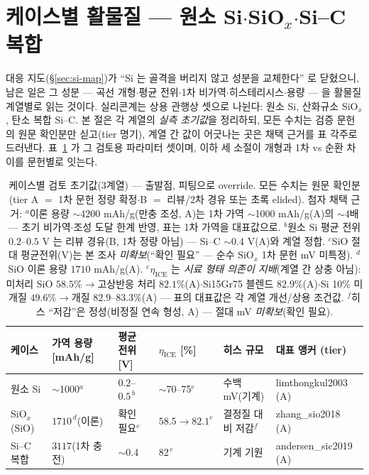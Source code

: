 \section{케이스별 활물질 --- 원소 Si$\cdot$SiO$_x$$\cdot$Si--C 복합}\label{sec:si-cases}
대응 지도(\S\ref{sec:si-map})가 ``Si 는 골격을 버리지 않고 성분을 교체한다'' 로 닫혔으니, 남은 일은
그 성분 --- 곡선 개형$\cdot$평균 전위$\cdot$1차 비가역$\cdot$히스테리시스$\cdot$용량 --- 을 활물질 계열별로
읽는 것이다. 실리콘계는 상용 관행상 셋으로 나뉜다: 원소 Si, 산화규소 SiO$_x$, 탄소 복합 Si--C. 본 절은 각
계열의 \emph{실측 초기값}을 정리하되, 모든 수치는 검증 문헌의 원문 확인분만 싣고(tier 명기), 계열 간 값이
어긋나는 곳은 채택 근거를 표 각주로 드러낸다. 표~\ref{tab:si-cases} 가 그 검토용 파라미터
셋이며, 이하 세 소절이 개형과 1차 vs 순환 차이를 문헌별로 잇는다.

\begin{table}[t]
\centering\footnotesize
\renewcommand{\arraystretch}{1.3}
\caption{케이스별 검토 초기값(3계열) --- 출발점, 피팅으로 override. 모든 수치는 원문 확인분(tier A $=$
1차 문헌 정량 확정$\cdot$B $=$ 리뷰/2차 경유 또는 초록 elided). 첨자 채택 근거:
$^a$이론 용량 $\sim$4200 mAh/g(만충 조성\cite{wen_huggins1981}, A)는 1차 가역 $\sim$1000
mAh/g\cite{limthongkul2003}(A)의 $\sim$4배 --- 초기 비가역$\cdot$조성 도달 한계 반영, 표는 1차 가역을
대표값으로. $^b$원소 Si 평균 전위 $0.2$--$0.5$ V 는 리뷰 경유\cite{obrovac_chevrier2014}(B, 1차 정량
아님) --- Si--C $\sim$0.4 V\cite{andersen_sic2019}(A)와 계열 정합. $^c$SiO 절대 평균전위(V)는 본 조사
\emph{미확보}(``확인 필요'' --- 순수 SiO$_x$ 1차 문헌 mV 미특정). $^d$SiO 이론 용량 $1710$
mAh/g\cite{zhang_sio2018}(A). $^e$$\eta_\mathrm{ICE}$ 는 \emph{시료 형태 의존이 지배}(계열 간 상충
아님): 미처리 SiO $58.5\%\to$고상반응 처리 $82.1\%$\cite{yom_sio2016}(A)$\cdot$Si15Gr75 블렌드
$82.9\%$\cite{gautam_blend2024}(A)$\cdot$Si 10\% 미개질 $49.6\%\to$개질 $82.9$--$83.3\%$\cite{naboka_sic2021}(A)
--- 표의 대표값은 각 계열 개선/상용 조건값. $^f$히스 ``저감''은 정성(비정질 연속 형성\cite{kitada_sio2019},
A) --- 절대 mV \emph{미확보}(확인 필요).}
\label{tab:si-cases}
\begin{tabular}{@{}p{} p{} p{} p{} p{} p{}@{}}
\toprule
케이스 & 가역 용량 [mAh/g] & 평균 전위 [V] & $\eta_\mathrm{ICE}$ [\%] & 히스 규모 & 대표 앵커 (tier) \\
\midrule
원소 Si       & $\sim$1000$^a$      & $0.2$--$0.5^{\,b}$ & $\sim$70--75$^e$ & 수백 mV(기계)     & limthongkul2003 (A) \\
SiO$_x$ (SiO) & $1710^{\,d}$(이론)   & 확인 필요$^c$      & $58.5\to82.1^e$  & 결정질 대비 저감$^f$ & zhang\_sio2018 (A) \\
Si--C 복합    & $3117$(1차 충전)     & $\sim$0.4          & $82^{\,e}$       & 기계 기원          & andersen\_sic2019 (A) \\
\bottomrule
\end{tabular}
\end{table}

